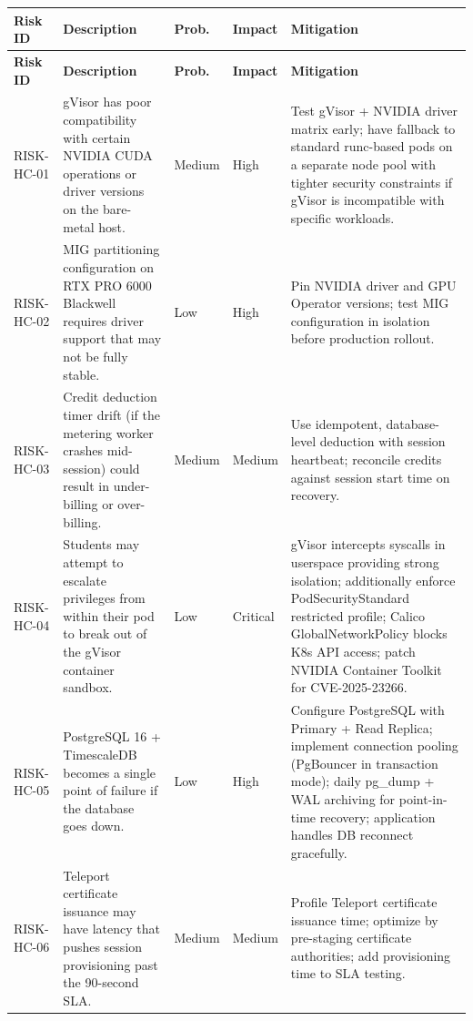 \documentclass[12pt,a4paper]{article}
\begin{document}
\begin{longtable}{@{}L{2cm}L{4.5cm}L{1.5cm}L{1.5cm}L{5cm}@{}}
  
    \textbf{Risk ID} & \textbf{Description} & \textbf{Prob.} & \textbf{Impact} & \textbf{Mitigation} \\
  \midrule
  \endfirsthead
  
    \textbf{Risk ID} & \textbf{Description} & \textbf{Prob.} & \textbf{Impact} & \textbf{Mitigation} \\
  \midrule
  \endhead
  
  \endfoot

  RISK-HC-01 & gVisor has poor compatibility with certain NVIDIA CUDA operations or driver versions on the bare-metal host. & Medium & High & Test gVisor + NVIDIA driver matrix early; have fallback to standard runc-based pods on a separate node pool with tighter security constraints if gVisor is incompatible with specific workloads. \\
    RISK-HC-02 & MIG partitioning configuration on RTX PRO 6000 Blackwell requires driver support that may not be fully stable. & Low & High & Pin NVIDIA driver and GPU Operator versions; test MIG configuration in isolation before production rollout. \\
  RISK-HC-03 & Credit deduction timer drift (if the metering worker crashes mid-session) could result in under-billing or over-billing. & Medium & Medium & Use idempotent, database-level deduction with session heartbeat; reconcile credits against session start time on recovery. \\
    RISK-HC-04 & Students may attempt to escalate privileges from within their pod to break out of the gVisor container sandbox. & Low & Critical & gVisor intercepts syscalls in userspace providing strong isolation; additionally enforce PodSecurityStandard restricted profile; Calico GlobalNetworkPolicy blocks K8s API access; patch NVIDIA Container Toolkit for CVE-2025-23266. \\
  RISK-HC-05 & PostgreSQL 16 + TimescaleDB becomes a single point of failure if the database goes down. & Low & High & Configure PostgreSQL with Primary + Read Replica; implement connection pooling (PgBouncer in transaction mode); daily pg\_dump + WAL archiving for point-in-time recovery; application handles DB reconnect gracefully. \\
    RISK-HC-06 & Teleport certificate issuance may have latency that pushes session provisioning past the 90-second SLA. & Medium & Medium & Profile Teleport certificate issuance time; optimize by pre-staging certificate authorities; add provisioning time to SLA testing. \\

\end{longtable}
\end{document}

